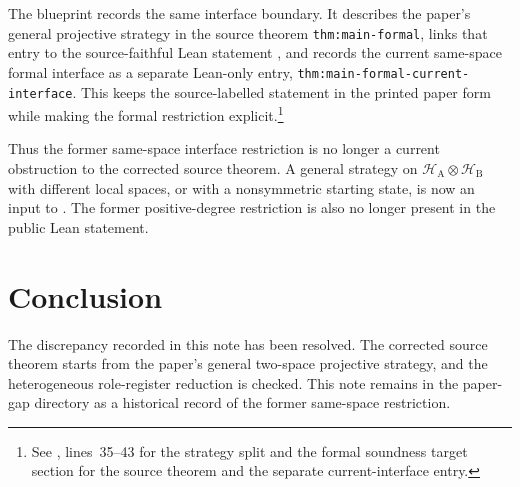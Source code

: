 \documentclass{article}
\begin{document}
The blueprint records the same interface boundary. It describes the paper's
general projective strategy in the source theorem
\texttt{thm:main-formal}, links that entry to the source-faithful Lean
statement , and records
the current same-space formal interface as a separate Lean-only entry,
\texttt{thm:main-formal-current-interface}.  This keeps the source-labelled
statement in the printed paper form while making the formal restriction
explicit.\footnote{See
, lines~35--43 for the strategy split
and the formal soundness target section for the source theorem and the separate
current-interface entry.}

Thus the former same-space interface restriction is no longer a current
obstruction to the corrected source theorem.  A general strategy on
\(\mathcal H_{\mathrm A}\otimes\mathcal H_{\mathrm B}\) with different local
spaces, or with a nonsymmetric starting state, is now an input to
.  The former
positive-degree restriction is also no longer present in the public Lean
statement.

\section{Conclusion}

The discrepancy recorded in this note has been resolved.  The corrected source
theorem starts from the paper's general two-space projective strategy, and the
heterogeneous role-register reduction is checked.  This note remains in the
paper-gap directory as a historical record of the former same-space
restriction.



\end{document}
